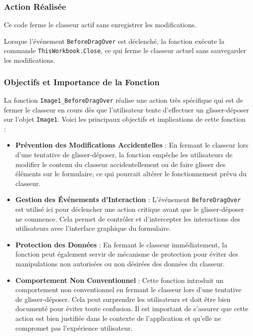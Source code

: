 \documentclass[a4paper, oneside, 12pt, final]{extreport}
\begin{document}
\subsubsection{Action Réalisée}
Ce code ferme le classeur actif sans enregistrer les modifications.

Lorsque l'événement \texttt{BeforeDragOver} est déclenché, la fonction exécute la commande \texttt{ThisWorkbook.Close}, ce qui ferme le classeur actuel sans sauvegarder les modifications.

\subsubsection{Objectifs et Importance de la Fonction}

La fonction \texttt{Image1\_BeforeDragOver} réalise une action très spécifique qui est de fermer le classeur en cours dès que l'utilisateur tente d'effectuer un glisser-déposer sur l'objet \texttt{Image1}. Voici les principaux objectifs et implications de cette fonction :

\begin{itemize}
    \item \textbf{Prévention des Modifications Accidentelles} : En fermant le classeur lors d'une tentative de glisser-déposer, la fonction empêche les utilisateurs de modifier le contenu du classeur accidentellement ou de faire glisser des éléments sur le formulaire, ce qui pourrait altérer le fonctionnement prévu du classeur.
    \item \textbf{Gestion des Événements d'Interaction} : L'événement \texttt{BeforeDragOver} est utilisé ici pour déclencher une action critique avant que le glisser-déposer ne commence. Cela permet de contrôler et d'intercepter les interactions des utilisateurs avec l'interface graphique du formulaire.
    \item \textbf{Protection des Données} : En fermant le classeur immédiatement, la fonction peut également servir de mécanisme de protection pour éviter des manipulations non autorisées ou non désirées des données du classeur.
    \item \textbf{Comportement Non Conventionnel} : Cette fonction introduit un comportement non conventionnel en fermant le classeur lors d'une tentative de glisser-déposer. Cela peut surprendre les utilisateurs et doit être bien documenté pour éviter toute confusion. Il est important de s'assurer que cette action est bien justifiée dans le contexte de l'application et qu'elle ne compromet pas l'expérience utilisateur.
\end{itemize}
\end{document}
